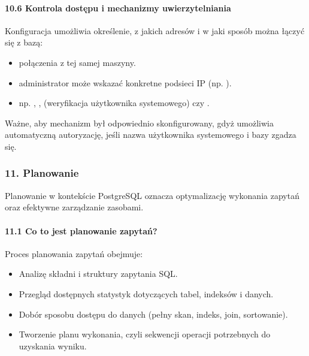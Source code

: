 \documentclass[letterpaper,10pt,polish]{sphinxmanual}
\begin{document}
\paragraph{10.6 Kontrola dostępu i mechanizmy uwierzytelniania}
\label{\detokenize{rozdzial2/Konfiguracja_baz_danych/Konfiguracja_baz_danych:kontrola-dostepu-i-mechanizmy-uwierzytelniania}}
\sphinxAtStartPar
Konfiguracja umożliwia określenie, z jakich adresów i w jaki sposób można łączyć się z bazą:
\begin{itemize}
\item {} 
\sphinxAtStartPar
{} \textendash{} połączenia z tej samej maszyny.

\item {} 
\sphinxAtStartPar
{} \textendash{} administrator może wskazać konkretne podsieci IP (np. ).

\item {} 
\sphinxAtStartPar
{} \textendash{} np. , ,  (weryfikacja użytkownika systemowego) czy .

\end{itemize}

\sphinxAtStartPar
Ważne, aby mechanizm  był odpowiednio skonfigurowany, gdyż umożliwia automatyczną autoryzację, jeśli nazwa użytkownika systemowego i bazy zgadza się.


\subsubsection{11. Planowanie}
\label{\detokenize{rozdzial2/Konfiguracja_baz_danych/Konfiguracja_baz_danych:planowanie}}
\sphinxAtStartPar
Planowanie w kontekście PostgreSQL oznacza optymalizację wykonania zapytań oraz efektywne zarządzanie zasobami.


\paragraph{11.1 Co to jest planowanie zapytań?}
\label{\detokenize{rozdzial2/Konfiguracja_baz_danych/Konfiguracja_baz_danych:co-to-jest-planowanie-zapytan}}
\sphinxAtStartPar
Proces planowania zapytań obejmuje:
\begin{itemize}
\item {} 
\sphinxAtStartPar
Analizę składni i struktury zapytania SQL.

\item {} 
\sphinxAtStartPar
Przegląd dostępnych statystyk dotyczących tabel, indeksów i danych.

\item {} 
\sphinxAtStartPar
Dobór sposobu dostępu do danych (pełny skan, indeks, join, sortowanie).

\item {} 
\sphinxAtStartPar
Tworzenie planu wykonania, czyli sekwencji operacji potrzebnych do uzyskania wyniku.

\end{itemize}
\end{document}
